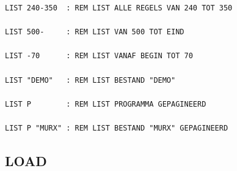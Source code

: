 \begin{description}[leftmargin=2cm,style=nextline]
\begin{tcolorbox}[colback=black,coltext=white]
\begin{verbatim}
LIST 240-350  : REM LIST ALLE REGELS VAN 240 TOT 350

LIST 500-     : REM LIST VAN 500 TOT EIND

LIST -70      : REM LIST VANAF BEGIN TOT 70

LIST "DEMO"   : REM LIST BESTAND "DEMO"

LIST P        : REM LIST PROGRAMMA GEPAGINEERD

LIST P "MURX" : REM LIST BESTAND "MURX" GEPAGINEERD
\end{verbatim}
\end{tcolorbox}
\end{description}


\newpage
\subsection{LOAD}
